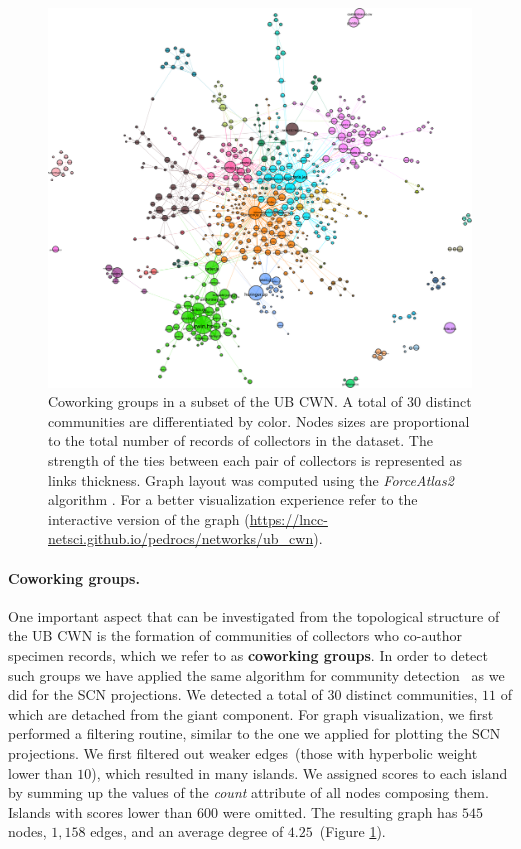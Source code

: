 \begin{figure}[h!]
  	\centering
    \includegraphics[width=\linewidth]{figures/casestudy_ub/cwn_communities.pdf}
    \caption[Coworking groups in the UB CWN.]{ Coworking groups in a subset of the UB CWN. A total of $30$ distinct communities are differentiated by color. Nodes sizes are proportional to the total number of records of collectors in the dataset. The strength of the ties between each pair of collectors is represented as links thickness. Graph layout was computed using the \textit{ForceAtlas2} algorithm \cite{Jacomy2014}. For a better visualization experience refer to the interactive version of the graph (\url{https://lncc-netsci.github.io/pedrocs/networks/ub_cwn}).}
    \label{fig:ub_cwn_communities}
\end{figure}

\paragraph{Coworking groups.}

One important aspect that can be investigated from the topological structure of the UB CWN is the formation of communities of collectors who co-author specimen records, which we refer to as \textbf{coworking groups}. 
%
In order to detect such groups we have applied the same algorithm for community detection~\cite{Blondel2008} as we did for the SCN projections.
%
We detected a total of $30$ distinct communities, $11$ of which are detached from the giant component.
%
For graph visualization, we first performed a filtering routine, similar to the one we applied for plotting the SCN projections. 
We first filtered out weaker edges~(those with hyperbolic weight lower than $10$), which resulted in many islands. We assigned scores to each island by summing up the values of the \textit{count} attribute of all nodes composing them. 
Islands with scores lower than $600$ were omitted.
The resulting graph has $545$ nodes, $1,158$ edges, and an average degree of $4.25$~(Figure \ref{fig:ub_cwn_communities}).

